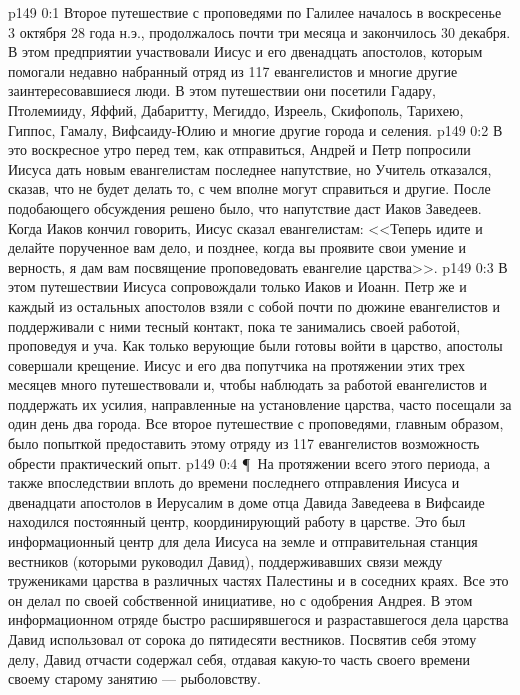 \vs p149 0:1 Второе путешествие с проповедями по Галилее началось в воскресенье 3 октября 28 года н.э., продолжалось почти три месяца и закончилось 30 декабря. В этом предприятии участвовали Иисус и его двенадцать апостолов, которым помогали недавно набранный отряд из 117 евангелистов и многие другие заинтересовавшиеся люди. В этом путешествии они посетили Гадару, Птолемииду, Яффий, Дабаритту, Мегиддо, Изреель, Скифополь, Тарихею, Гиппос, Гамалу, Вифсаиду\hyp{}Юлию и многие другие города и селения.
\vs p149 0:2 В это воскресное утро перед тем, как отправиться, Андрей и Петр попросили Иисуса дать новым евангелистам последнее напутствие, но Учитель отказался, сказав, что не будет делать то, с чем вполне могут справиться и другие. После подобающего обсуждения решено было, что напутствие даст Иаков Заведеев. Когда Иаков кончил говорить, Иисус сказал евангелистам: <<Теперь идите и делайте порученное вам дело, и позднее, когда вы проявите свои умение и верность, я дам вам посвящение проповедовать евангелие царства>>.
\vs p149 0:3 В этом путешествии Иисуса сопровождали только Иаков и Иоанн. Петр же и каждый из остальных апостолов взяли с собой почти по дюжине евангелистов и поддерживали с ними тесный контакт, пока те занимались своей работой, проповедуя и уча. Как только верующие были готовы войти в царство, апостолы совершали крещение. Иисус и его два попутчика на протяжении этих трех месяцев много путешествовали и, чтобы наблюдать за работой евангелистов и поддержать их усилия, направленные на установление царства, часто посещали за один день два города. Все второе путешествие с проповедями, главным образом, было попыткой предоставить этому отряду из 117 евангелистов возможность обрести практический опыт.
\vs p149 0:4 \P\ На протяжении всего этого периода, а также впоследствии вплоть до времени последнего отправления Иисуса и двенадцати апостолов в Иерусалим в доме отца Давида Заведеева в Вифсаиде находился постоянный центр, координирующий работу в царстве. Это был информационный центр для дела Иисуса на земле и отправительная станция вестников (которыми руководил Давид), поддерживавших связи между тружениками царства в различных частях Палестины и в соседних краях. Все это он делал по своей собственной инициативе, но с одобрения Андрея. В этом информационном отряде быстро расширявшегося и разраставшегося дела царства Давид использовал от сорока до пятидесяти вестников. Посвятив себя этому делу, Давид отчасти содержал себя, отдавая какую\hyp{}то часть своего времени своему старому занятию --- рыболовству.
